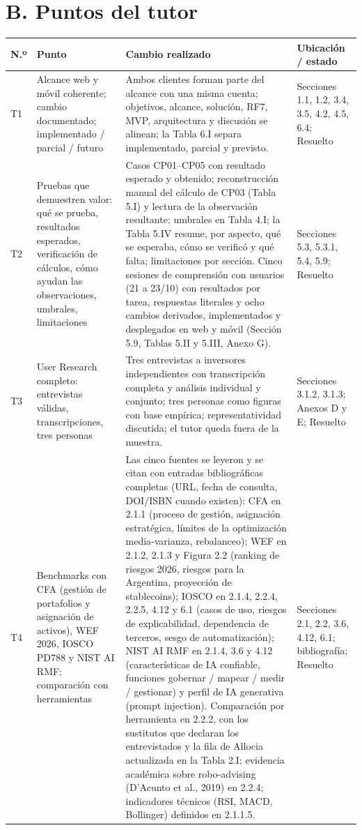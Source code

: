 \documentclass[a4paper,11pt]{article}
\newcommand{\ok}{\textcolor{green!45!black}{Resuelto}}
\begin{document}
\section*{B. Puntos del tutor}
\begin{longtable}{>{\raggedright\arraybackslash}p{0.6cm}>{\raggedright\arraybackslash}p{4.6cm}>{\raggedright\arraybackslash}p{8.0cm}>{\raggedright\arraybackslash}p{3.3cm}}
\toprule
\textbf{N.º} & \textbf{Punto} & \textbf{Cambio realizado} & \textbf{Ubicación / estado}\\\midrule
\endhead
T1 & Alcance web y móvil coherente; cambio documentado; implementado / parcial / futuro & Ambos clientes forman parte del alcance con una misma cuenta; objetivos, alcance, solución, RF7, MVP, arquitectura y discusión se alinean; la Tabla 6.I separa implementado, parcial y previsto. & Secciones 1.1, 1.2, 3.4, 3.5, 4.2, 4.5, 6.4; \ok\\
T2 & Pruebas que demuestren valor: qué se prueba, resultados esperados, verificación de cálculos, cómo ayudan las observaciones, umbrales, limitaciones & Casos CP01--CP05 con resultado esperado y obtenido; reconstrucción manual del cálculo de CP03 (Tabla 5.I) y lectura de la observación resultante; umbrales en Tabla 4.I; la Tabla 5.IV resume, por aspecto, qué se esperaba, cómo se verificó y qué falta; limitaciones por sección. Cinco sesiones de comprensión con usuarios (21 a 23/10) con resultados por tarea, respuestas literales y ocho cambios derivados, implementados y desplegados en web y móvil (Sección 5.9, Tablas 5.II y 5.III, Anexo G). & Secciones 5.3, 5.3.1, 5.4, 5.9; \ok\\
T3 & User Research completo: entrevistas válidas, transcripciones, tres personas & Tres entrevistas a inversores independientes con transcripción completa y análisis individual y conjunto; tres personas como figuras con base empírica; representatividad discutida; el tutor queda fuera de la muestra. & Secciones 3.1.2, 3.1.3; Anexos D y E; \ok\\
T4 & Benchmarks con CFA (gestión de portafolios y asignación de activos), WEF 2026, IOSCO PD788 y NIST AI RMF; comparación con herramientas & Las cinco fuentes se leyeron y se citan con entradas bibliográficas completas (URL, fecha de consulta, DOI/ISBN cuando existen): CFA en 2.1.1 (proceso de gestión, asignación estratégica, límites de la optimización media-varianza, rebalanceo); WEF en 2.1.2, 2.1.3 y Figura 2.2 (ranking de riesgos 2026, riesgos para la Argentina, proyección de stablecoins); IOSCO en 2.1.4, 2.2.4, 2.2.5, 4.12 y 6.1 (casos de uso, riesgos de explicabilidad, dependencia de terceros, sesgo de automatización); NIST AI RMF en 2.1.4, 3.6 y 4.12 (características de IA confiable, funciones gobernar / mapear / medir / gestionar) y perfil de IA generativa (prompt injection). Comparación por herramienta en 2.2.2, con los sustitutos que declaran los entrevistados y la fila de Allocia actualizada en la Tabla 2.I; evidencia académica sobre robo-advising (D'Acunto et al., 2019) en 2.2.4; indicadores técnicos (RSI, MACD, Bollinger) definidos en 2.1.1.5. & Secciones 2.1, 2.2, 3.6, 4.12, 6.1; bibliografía; \ok\\

\end{longtable}
\end{document}
